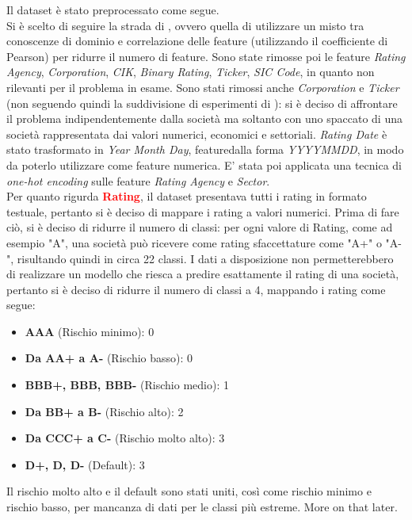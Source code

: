 \noindent Il dataset è stato preprocessato come segue. \\ Si è scelto di seguire la strada di \cite{makwana2022get}, ovvero quella di utilizzare un misto tra conoscenze di dominio e correlazione delle feature (utilizzando il coefficiente di Pearson) per ridurre il numero di feature. Sono state rimosse poi le feature \textit{Rating Agency}, \textit{Corporation}, \textit{CIK}, \textit{Binary Rating}, \textit{Ticker}, \textit{SIC Code}, in quanto non rilevanti per il problema in esame. Sono stati rimossi anche \textit{Corporation} e \textit{Ticker} (non seguendo quindi la suddivisione di esperimenti di \cite{nguyen2021multimodal}): si è deciso di affrontare il problema indipendentemente dalla società ma soltanto con uno spaccato di una società rappresentata dai valori numerici, economici e settoriali. \textit{Rating Date} è stato trasformato in \textit{Year Month Day}, featuredalla forma \textit{YYYYMMDD}, in modo da poterlo utilizzare come feature numerica. E' stata poi applicata una tecnica di \textit{one-hot encoding} sulle feature \textit{Rating Agency} e \textit{Sector}. \\ Per quanto rigurda \textbf{\textcolor{red}{Rating}}, il dataset presentava tutti i rating in formato testuale, pertanto si è deciso di mappare i rating a valori numerici. Prima di fare ciò, si è deciso di ridurre il numero di classi: per ogni valore di Rating, come ad esempio "A", una società può ricevere come rating sfaccettature come "A+" o "A-", risultando quindi in circa 22 classi. I dati a disposizione non permetterebbero di realizzare un modello che riesca a predire esattamente il rating di una società, pertanto si è deciso di ridurre il numero di classi a 4, mappando i rating come segue:
\begin{itemize}[label=-]
    \item \textbf{AAA} (Rischio minimo):  0
    \item \textbf{Da AA+ a A-} (Rischio basso):  0
    \item \textbf{BBB+, BBB, BBB-} (Rischio medio): 1
    \item \textbf{Da BB+ a B-} (Rischio alto): 2
    \item \textbf{Da CCC+ a C-} (Rischio molto alto): 3
    \item \textbf{D+, D, D-} (Default): 3
\end{itemize}
\noindent Il rischio molto alto e il default sono stati uniti, così come rischio minimo e rischio basso, per mancanza di dati per le classi più estreme. More on that later.
